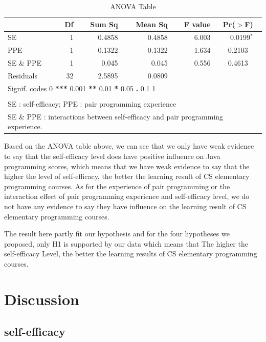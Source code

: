 \documentclass{sigchi}
\begin{document}
\begin{table}[ht]
\begin{center}
\caption{ANOVA Table}
\label{table1}
\begin{tabular}{lrrrrc}
  \hline
 & Df & Sum Sq & Mean Sq & F value & Pr($>$F) \\ 
  \hline
SE      &1	&0.4858	&0.4858	 &6.003	  &~~0.0199$^*$  \\
PPE         &1	&0.1322	&0.1322	 &1.634	  &0.2103      \\ 
 SE \& PPE          &1	&0.045	&0.045	&0.556	&0.4613  \\
  Residuals  	&32	&2.5895 & 0.0809 &  &  \\ 
   \hline
   \hline
\multicolumn{6}{l}{Signif. codes    0 \textbf{ *** } 0.001 \textbf{ ** } 0.01\textbf{ * } 0.05 \textbf{ . } 0.1 \textbf{   } 1} \\ 
\hline \\
\multicolumn{6}{l}{\small SE : self-efficacy; PPE :  pair programming experience} \\
\multicolumn{6}{l}{\small SE \& PPE  : interactions between self-efficacy and pair programming experience.}
\end{tabular}
\end{center}
\end{table}

Based on the ANOVA table above, we can see that we only have weak evidence to say that the self-efficacy level does have positive influence on Java programming scores, which means that we have weak evidence to say that the higher the level of self-efficacy, the better the learning result of CS elementary programming courses. As for the experience of pair programming or the interaction effect of pair programming experience and self-efficacy level, we do not have any evidence to say they have influence on the learning result of CS elementary programming courses.

The result here partly fit our hypothesis and for the four hypotheses we proposed, only H1 is supported by our data which means that The higher the self-efficacy Level, the better the learning results of CS elementary programming courses. 


\section{Discussion}
\subsection{self-efficacy}
\end{document}
